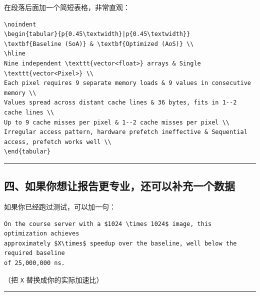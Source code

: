 \documentclass[11pt, a4paper]{article}
\begin{document}
\begin{aibox}
在段落后面加一个简短表格，非常直观：

\begin{tcolorbox}[colback=white,colframe=gray!50!white,boxrule=0.5pt,arc=2pt,left=5pt,right=5pt,top=5pt,bottom=5pt]
\begin{verbatim}
\noindent
\begin{tabular}{p{0.45\textwidth}|p{0.45\textwidth}}
\textbf{Baseline (SoA)} & \textbf{Optimized (AoS)} \\
\hline
Nine independent \texttt{vector<float>} arrays & Single \texttt{vector<Pixel>} \\
Each pixel requires 9 separate memory loads & 9 values in consecutive memory \\
Values spread across distant cache lines & 36 bytes, fits in 1--2 cache lines \\
Up to 9 cache misses per pixel & 1--2 cache misses per pixel \\
Irregular access pattern, hardware prefetch ineffective & Sequential access, prefetch works well \\
\end{tabular}
\end{verbatim}
\end{tcolorbox}

\begin{center}\rule{\textwidth}{0.4pt}\end{center}

\subsection*{四、如果你想让报告更专业，还可以补充一个数据}

如果你已经跑过测试，可以加一句：

\begin{tcolorbox}[colback=white,colframe=gray!50!white,boxrule=0.5pt,arc=2pt,left=5pt,right=5pt,top=5pt,bottom=5pt]
\begin{verbatim}
On the course server with a $1024 \times 1024$ image, this optimization achieves 
approximately $X\times$ speedup over the baseline, well below the required baseline 
of 25,000,000 ns.
\end{verbatim}
\end{tcolorbox}

（把 \texttt{X} 替换成你的实际加速比）

\begin{center}\rule{\textwidth}{0.4pt}\end{center}


\end{aibox}
\end{document}
